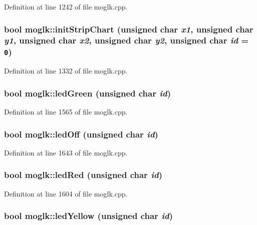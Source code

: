 Definition at line 1242 of file moglk.cpp.\hypertarget{classmoglk_34c40a476ff9cfd4342c0990dc3fd827}{
\subsubsection[{initStripChart}]{\setlength{\rightskip}{0pt plus 5cm}bool moglk::initStripChart (unsigned char {\em x1}, \/  unsigned char {\em y1}, \/  unsigned char {\em x2}, \/  unsigned char {\em y2}, \/  unsigned char {\em id} = {\tt 0})}}
\label{classmoglk_34c40a476ff9cfd4342c0990dc3fd827}




Definition at line 1332 of file moglk.cpp.\hypertarget{classmoglk_355677082e83cae9f360be695a4ad5bf}{
\subsubsection[{ledGreen}]{\setlength{\rightskip}{0pt plus 5cm}bool moglk::ledGreen (unsigned char {\em id})}}
\label{classmoglk_355677082e83cae9f360be695a4ad5bf}




Definition at line 1565 of file moglk.cpp.\hypertarget{classmoglk_f04915ee646e076725185334596ac586}{
\subsubsection[{ledOff}]{\setlength{\rightskip}{0pt plus 5cm}bool moglk::ledOff (unsigned char {\em id})}}
\label{classmoglk_f04915ee646e076725185334596ac586}




Definition at line 1643 of file moglk.cpp.\hypertarget{classmoglk_9ddc6b3f833eff3fe4abc3c80ec6e0a1}{
\subsubsection[{ledRed}]{\setlength{\rightskip}{0pt plus 5cm}bool moglk::ledRed (unsigned char {\em id})}}
\label{classmoglk_9ddc6b3f833eff3fe4abc3c80ec6e0a1}




Definition at line 1604 of file moglk.cpp.\hypertarget{classmoglk_f21d21869ca65ab294c0666b1c0690f3}{
\subsubsection[{ledYellow}]{\setlength{\rightskip}{0pt plus 5cm}bool moglk::ledYellow (unsigned char {\em id})}}
\label{classmoglk_f21d21869ca65ab294c0666b1c0690f3}




